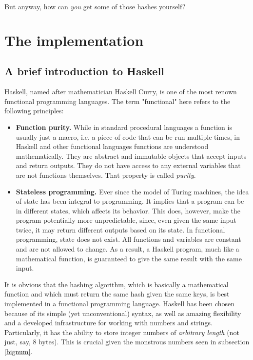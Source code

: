 \documentclass[12pt, a4paper]{article}
\begin{document}
But anyway, how can \emph{you} get some of those hashes yourself?

\section{The implementation}

\subsection{A brief introduction to Haskell}

Haskell, named after mathematician Haskell Curry, is one of the most renown functional programming languages. The term "functional" here refers to the following principles:

\begin{itemize}
    \item \textbf{Function purity.} While in standard procedural languages a function is usually just a macro, i.e. a piece of code that can be run multiple times, in Haskell and other functional languages functions are understood mathematically. They are abstract and immutable objects that accept inputs and return outputs. They do not have access to any external variables that are not functions themselves. That property is called \emph{purity}.
    \item \textbf{Stateless programming.} Ever since the model of Turing machines, the idea of state has been integral to programming. It implies that a program can be in different states, which affects its behavior. This does, however, make the program potentially more unpredictable, since, even given the same input twice, it may return different outputs based on its state. In functional programming, state does not exist. All functions and variables are constant and are not allowed to change. As a result, a Haskell program, much like a mathematical function, is guaranteed to give the same result with the same input.
\end{itemize}

It is obvious that the hashing algorithm, which is basically a mathematical function and which must return the same hash given the same keys, is best implemented in a functional programming language. Haskell has been chosen because of its simple (yet unconventional) syntax, as well as amazing flexibility and a developed infrastructure for working with numbers and strings. Particularly, it has the ability to store integer numbers of \emph{arbitrary length} (not just, say, 8 bytes). This is crucial given the monstrous numbers seen in subsection \ref{bignum}.
\end{document}
